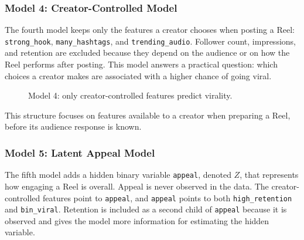 \documentclass{article}
\begin{document}
\subsubsection{Model 4: Creator-Controlled Model}
The fourth model keeps only the features a creator chooses when posting a
Reel: \texttt{strong\_hook}, \texttt{many\_hashtags}, and
\texttt{trending\_audio}. Follower count, impressions, and retention are
excluded because they depend on the audience or on how the Reel performs
after posting. This model answers a practical question: which choices a
creator makes are associated with a higher chance of going viral.

\begin{figure}[H]
  \centering
  \caption{Model 4: only creator-controlled features predict virality.}
  \label{fig:model-creator}
\end{figure}

This structure focuses on features available to a creator when preparing a
Reel, before its audience response is known.

\subsubsection{Model 5: Latent Appeal Model}
The fifth model adds a hidden binary variable \texttt{appeal}, denoted $Z$,
that represents how engaging a Reel is overall. Appeal is never observed in
the data. The creator-controlled features point to \texttt{appeal}, and
\texttt{appeal} points to both \texttt{high\_retention} and
\texttt{bin\_viral}. Retention is included as a second child of
\texttt{appeal} because it is observed and gives the model more information
for estimating the hidden variable.
\end{document}
